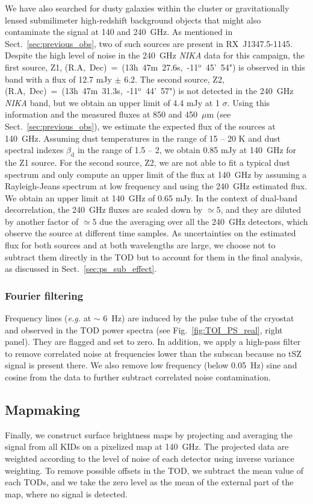 We have also searched for dusty galaxies within the cluster or gravitationally lensed submilimeter high-redshift background objects that might also contaminate the signal at 140 and 240~GHz. As mentioned in Sect.~\ref{sec:previous_obs}, two of such sources are present in \mbox{RX~J1347.5-1145}. Despite the high level of noise in the 240~GHz {\it NIKA} data for this campaign, the first source, Z1, (R.A,~Dec)~=~(13h~47m~27.6s,~-11$^{\mathrm{o}}$~45'~54") is observed in this band with a flux of 12.7 mJy $\pm$ 6.2. The second source, Z2, (R.A,~Dec)~=~(13h~47m~31.3s,~-11$^{\mathrm{o}}$~44'~57") is not detected in the 240~GHz {\it NIKA} band, but we obtain an upper limit of 4.4 mJy at 1 $\sigma$. Using this information and the measured fluxes at 850 and 450~$\mu$m (see Sect.~\ref{sec:previous_obs}), we estimate the expected flux of the sources at 140~GHz. Assuming dust temperatures in the range of 15 -- 20 K and dust spectral indexes $\beta_{\mathrm{d}}$ in the range of 1.5 -- 2, we obtain 0.85 mJy  at 140~GHz for the Z1 source. For the second source, Z2, we are not able to fit a typical dust spectrum and only compute an upper limit of the flux at 140~GHz by assuming a Rayleigh-Jeans spectrum at low frequency and using the 240~GHz estimated flux. We obtain an upper limit at 140~GHz of 0.65 mJy. In the context of dual-band decorrelation, the 240~GHz fluxes are scaled down by $\simeq 5$, and they are diluted by another factor of $\simeq 5$ due the averaging over all the 240~GHz detectors, which observe the source at different time samples. As uncertainties on the estimated flux for both sources and at both wavelengths are large, we choose not to subtract them directly in the TOD but to account for them in the final analysis, as discussed in Sect.~\ref{sec:ps_sub_effect}.

\subsubsection{Fourier filtering}
Frequency lines ({\it e.g.} at $\sim$ 6~Hz) are induced by the pulse tube of the cryostat and observed in the TOD power spectra (see Fig.~\ref{fig:TOI_PS_real}, right panel). They are flagged and set to zero. In addition, we apply a high-pass filter to remove correlated noise at frequencies lower than the subscan because no tSZ signal is present there. We also remove low frequency (below 0.05~Hz) sine and cosine from the data to further subtract correlated noise contamination.

\subsection{Mapmaking}
\label{sec:mapmaking}
Finally, we construct surface brightness maps by projecting and averaging the signal from all KIDs on a pixelized map at 140~GHz. The projected data are weighted according to the level of noise of each detector using inverse variance weighting. To remove possible offsets in the TOD, we subtract the mean value of each TODs, and we take the zero level as the mean of the external part of the map, where no signal is detected.
	
